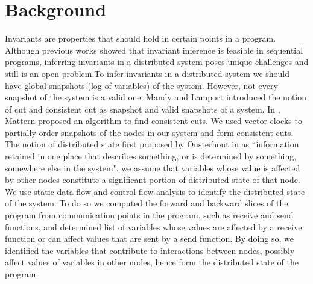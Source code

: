 \section{Background}

Invariants are properties that should hold in certain points in a program. Although previous works \cite{ernst2001dynamically} showed that invariant inference is feasible in sequential programs, inferring invariants in a distributed system poses unique challenges and still is an open problem.To infer invariants in a distributed system we should have global snapshots (log of variables) of the system. However, not every snapshot of the system is a valid one. Mandy and Lamport introduced the notion of cut and consistent cut as snapshot and valid snapshots of a system. In \cite{mattern1989virtual}, Mattern proposed an algorithm to find consistent cuts. We used vector clocks \cite{vectorclock} to partially order snapshots of the nodes in our system and form consistent cuts. The notion of distributed state first proposed by Ousterhout in \cite{ousterhout1991role} as ``information retained in one place that describes something, or is determined by something, somewhere else in the system", we assume that variables whose value is affected by other nodes constitute a significant portion of distributed state of that node. We use static data flow and control flow analysis to identify the distributed state of the system. To do so we computed the forward and backward slices of the program  \cite{programslice} from communication points in the program, such as receive and send functions, and determined list of variables whose values are affected by a receive function or can affect values that are sent by a send function. By doing so, we identified the variables that contribute to interactions between nodes, possibly affect values of variables in other nodes, hence form the distributed state of the program.

